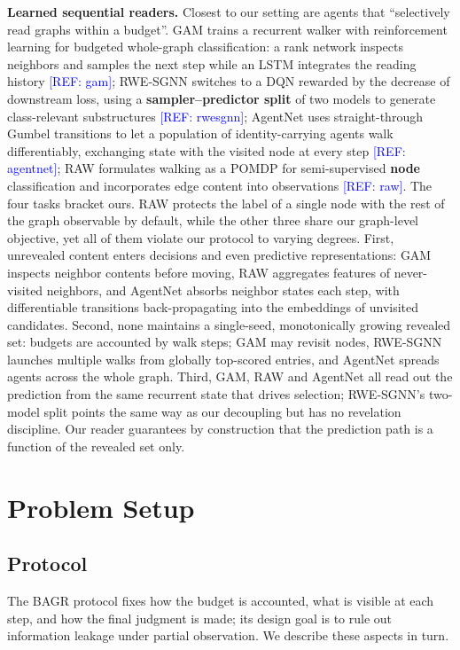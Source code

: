 \documentclass{article}
\newcommand{\refadd}[1]{\textcolor{blue}{[REF: #1]}}
\begin{document}
\textbf{Learned sequential readers.} Closest to our setting are agents that ``selectively read graphs within a budget''. GAM trains a recurrent walker with reinforcement learning for budgeted whole-graph classification: a rank network inspects neighbors and samples the next step while an LSTM integrates the reading history \refadd{gam}; RWE-SGNN switches to a DQN rewarded by the decrease of downstream loss, using a \textbf{sampler--predictor split} of two models to generate class-relevant substructures \refadd{rwesgnn}; AgentNet uses straight-through Gumbel transitions to let a population of identity-carrying agents walk differentiably, exchanging state with the visited node at every step \refadd{agentnet}; RAW formulates walking as a POMDP for semi-supervised \textbf{node} classification and incorporates edge content into observations \refadd{raw}. The four tasks bracket ours. RAW protects the label of a single node with the rest of the graph observable by default, while the other three share our graph-level objective, yet all of them violate our protocol to varying degrees. First, unrevealed content enters decisions and even predictive representations: GAM inspects neighbor contents before moving, RAW aggregates features of never-visited neighbors, and AgentNet absorbs neighbor states each step, with differentiable transitions back-propagating into the embeddings of unvisited candidates. Second, none maintains a single-seed, monotonically growing revealed set: budgets are accounted by walk steps; GAM may revisit nodes, RWE-SGNN launches multiple walks from globally top-scored entries, and AgentNet spreads agents across the whole graph. Third, GAM, RAW and AgentNet all read out the prediction from the same recurrent state that drives selection; RWE-SGNN's two-model split points the same way as our decoupling but has no revelation discipline. Our reader guarantees by construction that the prediction path is a function of the revealed set only.

\section{Problem Setup}
\label{sec:setup}

\subsection{Protocol}
\label{subsec:protocol}

The BAGR protocol fixes how the budget is accounted, what is visible at each step, and how the final judgment is made; its design goal is to rule out information leakage under partial observation. We describe these aspects in turn.
\end{document}

